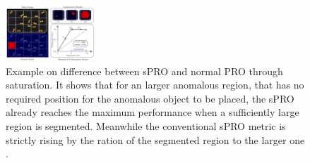 \begin{figure}[ht]
    \centering
    \includegraphics[width=0.3\textwidth]{figures/spro_vs_pro_bergmann.png}
    \caption{Example on difference between sPRO and normal PRO through saturation. It shows that for an larger anomalous region, that has no required 
             position for the anomalous object to be placed, the sPRO already reaches the maximum performance when a sufficiently large 
             region is segmented. Meanwhile the conventional sPRO metric is strictly rising by the ration of the segmented region to the larger one \cite{LOCODentsAndScratchesBergmann2022}.}
    \label{fig:sprovspro}
\end{figure}



